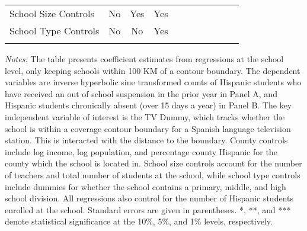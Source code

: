 \begin{table}[!h]
{\begin{threeparttable}
\begin{tabular}{lcccccccccc}
                                School Size Controls & No & Yes & Yes\\
                                School Type Controls & No & No & Yes \\
				\addlinespace\hline\hline
			\end{tabular}
			\begin{tablenotes}[flushleft]
				\item \textit{Notes:} The table presents coefficient estimates from regressions at the school level, only keeping schools within 100 KM of a contour boundary. The dependent variables are inverse hyperbolic sine transformed counts of Hispanic students who have received an out of school suspension in the prior year in Panel A, and Hispanic students chronically absent (over 15 days a year) in Panel B. The key independent variable of interest is the TV Dummy, which tracks whether the school is within a coverage contour boundary for a Spanish language television station. This is interacted with the distance to the boundary. County controls include log income, log population, and percentage county Hispanic for the county which the school is located in. School size controls account for the number of teachers and total number of students at the school, while school type controls include dummies for whether the school contains a primary, middle, and high school division. All regressions also control for the number of Hispanic students enrolled at the school. Standard errors are given in parentheses. *, **, and *** denote statistical significance at the 10\%, 5\%, and 1\% levels, respectively.
			\end{tablenotes}
		\end{threeparttable}
	}
\end{table}